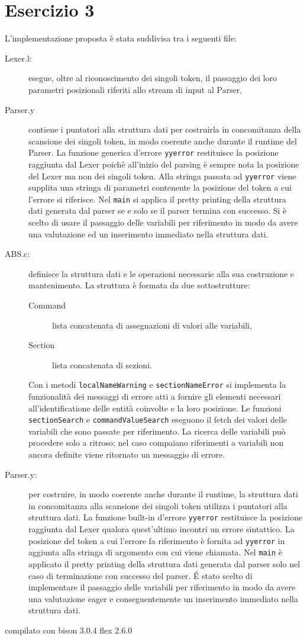 \documentclass[a4paper,oneside,11pt]{article}
\begin{document}
\section*{Esercizio 3}
L'implementazione proposta è stata suddivisa tra i seguenti file:
\begin{description}
	\item[Lexer.l:] esegue, oltre al riconoscimento dei singoli token, il passaggio dei loro parametri posizionali riferiti allo stream di input al Parser,
	\item[Parser.y] contiene i puntatori alla struttura dati per costruirla in concomitanza della scansione dei singoli token, in modo coerente anche durante il runtime del Parser. La funzione generica d'errore \texttt{yyerror} restituisce la posizione raggiunta dal Lexer poichè all'inizio del parsing è sempre nota la posizione del Lexer ma non dei singoli token. Alla stringa passata ad \texttt{yyerror} viene supplita una stringa di parametri contenente la posizione del token a cui l'errore si riferisce. Nel \texttt{main} si applica il pretty printing della struttura dati generata dal parser se e solo se il parser termina con successo. Si è scelto di usare il passaggio delle variabili per riferimento in modo da avere una valutazione ed un inserimento immediato nella struttura dati.
	\item[ABS.c:] definisce la struttura dati e le operazioni necessarie alla sua costruzione e mantenimento.
		La struttura è formata da due sottostrutture:
		\begin{description}
			\item[Command] lista concatenata di assegnazioni di valori alle variabili,
			\item[Section] lista concatenata di sezioni.
		\end{description}
		Con i metodi \texttt{localNameWarning} e \texttt{sectionNameError} si implementa la funzionalità dei messaggi di errore atti a fornire gli elementi necessari all'identificatione delle entità coinvolte e la loro posizione.
		Le funzioni \texttt{sectionSearch} e \texttt{commandValueSearch} eseguono il fetch dei valori delle variabili che sono passate per riferimento.
		La ricerca delle variabili può procedere solo a ritroso; nel caso compaiano riferimenti a variabili non ancora definite viene ritornato un messaggio di errore.

	\item[Parser.y:] per costruire, in modo coerente anche durante il runtime, la struttura dati in concomitanza alla scansione dei singoli token utilizza i puntatori alla struttura dati.
		La funzione built-in d'errore \texttt{yyerror} restituisce la posizione raggiunta dal Lexer qualora quest'ultimo incontri un errore sintattico.
		La posizione del token a cui l'errore fa riferimento è fornita ad \texttt{yyerror} in aggiunta alla stringa di argomento con cui viene chiamata. 
		Nel \texttt{main} è applicato il pretty printing della struttura dati generata dal parser solo nel caso di terminazione con successo del parser.
		\'E stato scelto di implementare il passaggio delle variabili per riferimento in modo da avere una valutazione eager e conseguentemente un inserimento immediato nella struttura dati.
\end{description}
compilato con bison 3.0.4
flex 2.6.0
\end{document}
